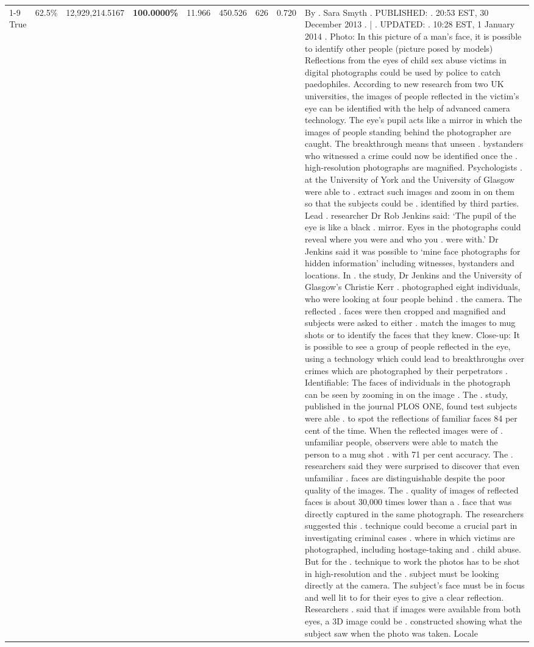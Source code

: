\begin{table}[H]
\begin{tabular}{lllrlllll}
\cline{1-9}
True & 62.5\% & 12,929,214.5167 & \bfseries \color{red} 100.0000\% & 11.966 & 450.526 & 626 & 0.720 & By . Sara Smyth . PUBLISHED: . 20:53 EST, 30 December 2013 . | . UPDATED: . 10:28 EST, 1 January 2014 . Photo: In this picture of a man's face, it is possible to identify other people (picture posed by models) Reflections from the eyes of child sex abuse victims in digital photographs could be used by police to catch paedophiles. According to new research from two UK universities, the images of people reflected in the victim's eye can be identified with the help of advanced camera technology. The eye's pupil acts like a mirror in which the images of people standing behind the photographer are caught. The breakthrough means that unseen . bystanders who witnessed a crime could now be identified once the . high-resolution photographs are magnified. Psychologists . at the University of York and the University of Glasgow were able to . extract such images and zoom in on them so that the subjects could be . identified by third parties. Lead . researcher Dr Rob Jenkins said: ‘The pupil of the eye is like a black . mirror. Eyes in the photographs could reveal where you were and who you . were with.' Dr Jenkins said it was possible to ‘mine face photographs for hidden information' including witnesses, bystanders and locations. In . the study, Dr Jenkins and the University of Glasgow's Christie Kerr . photographed eight individuals, who were looking at four people behind . the camera. The reflected . faces were then cropped and magnified and subjects were asked to either . match the images to mug shots or to identify the faces that they knew. Close-up: It is possible to see a group of people reflected in the eye, using a technology which could lead to breakthroughs over crimes which are photographed by their perpetrators . Identifiable: The faces of individuals in the photograph can be seen by zooming in on the image . The . study, published in the journal PLOS ONE, found test subjects were able . to spot the reflections of familiar faces 84 per cent of the time. When the reflected images were of . unfamiliar people, observers were able to match the person to a mug shot . with 71 per cent accuracy. The . researchers said they were surprised to discover that even unfamiliar . faces are distinguishable despite the poor quality of the images. The . quality of images of reflected faces is about 30,000 times lower than a . face that was directly captured in the same photograph. The researchers suggested this . technique could become a crucial part in investigating criminal cases . where in which victims are photographed, including hostage-taking and . child abuse. But for the . technique to work the photos has to be shot in high-resolution and the . subject must be looking directly at the camera. The subject's face must be in focus and well lit to for their eyes to give a clear reflection. Researchers . said that if images were available from both eyes, a 3D image could be . constructed showing what the subject saw when the photo was taken. Locale \\

\end{tabular}
\end{table}
